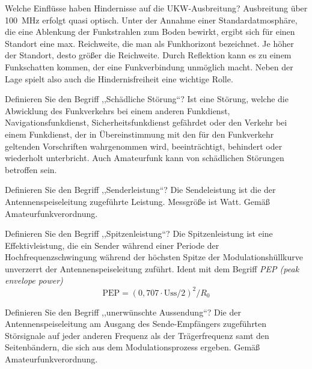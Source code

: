 \documentclass[avery5371,grid,frame,a4paper]{flashcards}
\newcommand{\card}[3]{
  \begin{flashcard}[{\chap} -- #1]{#2}#3\end{flashcard}
}
\begin{document}
\card{52}{Welche Einflüsse haben Hindernisse auf die UKW-Ausbreitung?}{
  Ausbreitung über \SI{100}{\mega\Hz} erfolgt quasi optisch. Unter der Annahme einer Standardatmosphäre, die eine Ablenkung der Funkstrahlen zum Boden bewirkt, ergibt sich für einen Standort eine max. Reichweite, die man als Funkhorizont bezeichnet. Je höher der Standort, desto größer die Reichweite. Durch Reflektion kann es zu einem Funkschatten kommen, der eine Funkverbindung unmöglich macht. Neben der Lage spielt also auch die Hindernisfreiheit eine wichtige Rolle.
}
\card{53}{Definieren Sie den Begriff ,,Schädliche Störung``?}{
  Ist eine Störung, welche die Abwicklung des Funkverkehrs bei einem anderen Funkdienst, Navigationsfunkdienst, Sicherheitsfunkdienst gefährdet oder den Verkehr bei einem Funkdienst, der in Übereinstimmung mit den für den Funkverkehr geltenden Vorschriften wahrgenommen wird, beeinträchtigt, behindert oder wiederholt unterbricht. Auch Amateurfunk kann von schädlichen Störungen betroffen sein.
}
\card{54}{Definieren Sie den Begriff ,,Senderleistung``?}{
  Die Sendeleistung ist die der Antennenspeiseleitung zugeführte Leistung. Messgröße ist Watt. Gemäß Amateurfunkverordnung.
}
\card{55}{Definieren Sie den Begriff ,,Spitzenleistung``?}{
  Die Spitzenleistung ist eine Effektivleistung, die ein Sender während einer Periode der Hochfrequenzschwingung während der höchsten Spitze der Modulationshüllkurve unverzerrt der Antennenspeiseleitung zuführt. Ident mit dem Begriff \emph{PEP (peak envelope power)}
  \[ \text{PEP} = (0,707 \cdot \text{Uss}/2)^2 / R_0 \]
}
\card{56}{Definieren Sie den Begriff ,,unerwünschte Aussendung``?}{
  Die der Antennenspeiseleitung am Ausgang des Sende-Empfängers zugeführten Störsignale auf jeder anderen Frequenz als der Trägerfrequenz samt den Seitenbändern, die sich aus dem Modulationsprozess ergeben. Gemäß Amateurfunkverordnung.
}
\end{document}
